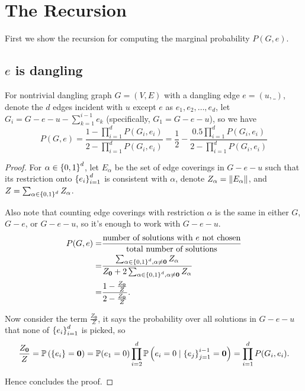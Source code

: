 
\section{The Recursion}

First we show the recursion for computing the marginal probability $P(G, e)$.

\subsection{$e$ is dangling}
\begin{Prop}
For nontrivial dangling graph $G=(V,E)$ with a dangling edge $e=(u,\_)$, denote the $d$ %
edges incident with $u$ except $e$ as $e_1, e_2, \ldots, e_d$,
let $G_i = G - e - u - \sum_{k=1}^{i-1} e_k$ (specifically, $G_1 = G - e - u$), so we have%
	\begin{equation}
		P(G, e) = \frac{1-\prod_{i=1}^d P(G_i, e_i)}{2 - \prod_{i=1}^d P(G_i, e_i)} = \frac{1}{2} - \frac{0.5 \prod_{i=1}^d P(G_i, e_i)}{2 - \prod_{i=1}^d P(G_i, e_i)}
		\label{propp3rg}
	\end{equation}
\end{Prop}
\begin{proof}
	For $\alpha \in \left\{0,1\right\}^d$, let $E_{\alpha}$ be the set of edge coverings in $G-e-u$ such that its restriction onto $\left\{e_i\right\}_{i=1}^{d}$ is consistent with $\alpha$, denote $Z_{\alpha} = \left\Vert E_{\alpha}\right\Vert$, and $Z = \sum_{\alpha \in \left\{0,1\right\}^d} Z_{\alpha}$. %

		Also note that counting edge coverings with restriction $\alpha$ is the same in either $G$, $G-e$, or $G-e-u$, so it's enough to work with $G-e-u$.
	\begin{align*}
		P(G,e) = & \frac{\textrm{number of solutions with $e$ not chosen}}{\textrm{total number of solutions}} \\
		=& \frac{\sum_{\alpha \in \left\{0,1\right\}^d, \alpha \neq \mathbf{0}} Z_{\alpha} }{ Z_{\mathbf{0}} + 2 \sum_{\alpha \in \left\{0,1\right\}^d, \alpha \neq \mathbf{0}} Z_{\alpha}} \\
		=& \frac{1 - \frac{Z_{\mathbf{0}}}{Z}}{ 2 - \frac{Z_{\mathbf{0}}}{Z}}.
	\end{align*}

	Now consider the term $\frac{Z_{\mathbf{0}}}{Z}$, it says the probability over all solutions in $G-e-u$ that none of $\left\{e_i\right\}_{i=1}^{d}$ is picked, so
	\begin{align*}
		\frac{Z_{\mathbf{0}}}{Z}=\mathbb{P} \left( \left\{e_i\right\} = \mathbf{0}\right) = \mathbb{P} (e_1 = 0) \prod_{i=2}^d \mathbb{P} \left(e_i = 0 \mid \left\{e_j\right\}_{j=1}^{i-1} = \mathbf{0}\right) = \prod_{i=1}^d P(G_i, e_i).
	\end{align*}

	Hence concludes the proof.
	
\end{proof}

